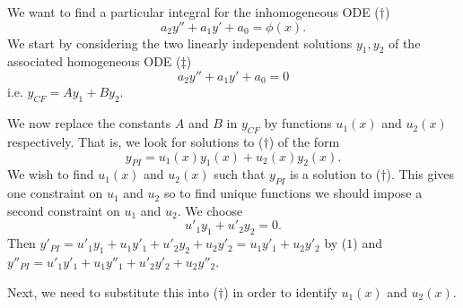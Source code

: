 \documentclass[10pt, a4paper]{article}
\begin{document}
We want to find a particular integral for the inhomogeneous ODE ($\dagger$)
\[
a_2y'' + a_1y' + a_0 = \phi(x).
\]
We start by considering the two linearly independent solutions $y_1, y_2$ of the associated homogeneous ODE ($\ddagger$)
\[
a_2y'' + a_1y' + a_0 = 0
\]
i.e. $y_{CF} = Ay_1 + By_2$.

We now replace the constants $A$ and $B$ in $y_{CF}$ by functions $u_1(x)$ and $u_2(x)$ respectively.
That is,
we look for solutions to ($\dagger$) of the form
\[
y_{PI} = u_1(x)y_1(x) + u_2(x)y_2(x).
\]
We wish to find $u_1(x)$ and $u_2(x)$ such that $y_{PI}$ is a solution to ($\dagger$).
This gives one constraint on $u_1$ and $u_2$ so to find unique functions we should impose a second constraint on $u_1$ and $u_2$.
We choose
\begin{equation}\tag{$1$}
    u'_1y_1 + u'_2y_2 = 0.
\end{equation}
Then $y'_{PI} = u'_1y_1 + u_1y'_1 + u'_2y_2 + u_2y'_2 = u_1y'_1 + u_2y'_2$ by ($1$) and $y''_{PI} = u'_1y'_1 + u_1y''_1 + u'_2y'_2 + u_2y''_2$.

Next,
we need to substitute this into ($\dagger$) in order to identify $u_1(x)$ and $u_2(x)$.
\end{document}
